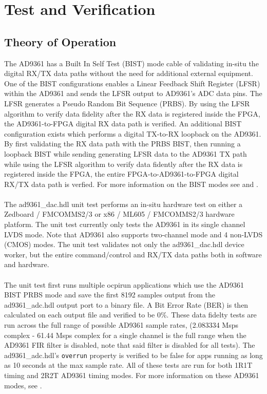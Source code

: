 \documentclass{article}
\def\comp{ad9361\_dac}
\begin{document}
\pagebreak
\section*{Test and Verification}
\subsection*{Theory of Operation}
The AD9361 has a Built In Self Test (BIST) mode cable of validating in-situ the digital RX/TX data paths without the need for additional external equipment. One of the BIST configurations enables a Linear Feedback Shift Register (LFSR) within the AD9361 and sends the LFSR output to AD9361's ADC data pins. The LFSR generates a Pseudo Random Bit Sequence (PRBS). By using the LFSR algorithm to verify data fidelity after the RX data is registered inside the FPGA, the AD9361-to-FPGA digital RX data path is verified. An additional BIST configuration exists which performs a digital TX-to-RX loopback on the AD9361. By first validating the RX data path with the PRBS BIST, then running a loopback BIST while sending generating LFSR data to the AD9361 TX path while using the LFSR algorithm to verify data fidently after the RX data is registered inside the FPGA, the entire FPGA-to-AD9361-to-FPGA digital RX/TX data path is verfied. For more information on the BIST modes see \cite{adi_bist_doc} and \cite{adi_ug570}. \\ \\
The \comp{}.hdl unit test performs an in-situ hardware test on either a Zedboard / FMCOMMS2/3 or x86 / ML605 / FMCOMMS2/3 hardware platform. The unit test currently only tests the AD9361 in its single channel LVDS mode. Note that AD9361 also supports two-channel mode and 4 non-LVDS (CMOS) modes. The unit test validates not only the \comp{}.hdl device worker, but the entire command/control and RX/TX data paths both in software and hardware. \\ \\
The unit test first runs multiple ocpirun applications which use the AD9361 BIST PRBS mode and save the first 8192 samples output from the ad9361\_adc.hdl output port to a binary file. A Bit Error Rate (BER) is then calculated on each output file and verified to be 0\%. These data fidelty tests are run across the full range of possible AD9361 sample rates, (2.083334 Msps complex - 61.44 Msps complex for a single channel is the full range when the AD9361 FIR filter is disabled, note that said filter is disabled for all tests). The ad9361\_adc.hdl's \verb+overrun+ property is verified to be false for apps running as long as 10 seconds at the max sample rate. All of these tests are run for both 1R1T timing and 2R2T AD9361 timing modes. For more information on these AD9361 modes, see \cite{adi_ug570}. \\ \\
\end{document}
